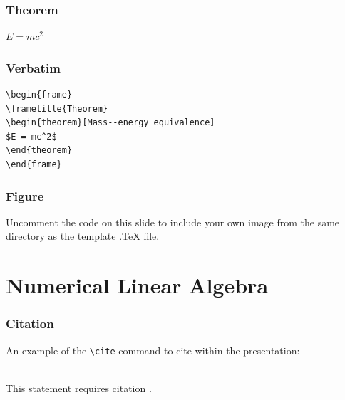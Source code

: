 \documentclass{beamer}
\begin{document}

\begin{frame}
\frametitle{Theorem}
\begin{theorem}
$E = mc^2$
\end{theorem}
\end{frame}


\begin{frame}[fragile] %
\frametitle{Verbatim}
\begin{example}
\begin{verbatim}
\begin{frame}
\frametitle{Theorem}
\begin{theorem}[Mass--energy equivalence]
$E = mc^2$
\end{theorem}
\end{frame}\end{verbatim}
\end{example}
\end{frame}


\begin{frame}
\frametitle{Figure}
Uncomment the code on this slide to include your own image from the same directory as the template .TeX file.
\end{frame}

\section{Numerical Linear Algebra}

\begin{frame}[fragile] %
\frametitle{Citation}
An example of the \verb|\cite| command to cite within the presentation:\\~

This statement requires citation \cite{p1}.
\end{frame}
\end{document}
